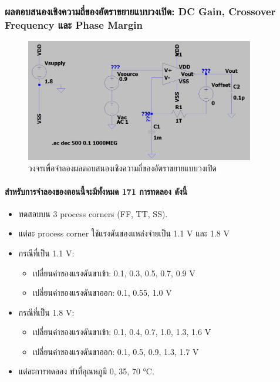 \documentclass[a4paper, 11pt, oneside]{book} %
\begin{document}
\subsubsection{ผลตอบสนองเชิงความถี่ของอัตราขยายแบบวงเปิด: DC Gain, Crossover Frequency และ Phase Margin}

\begin{figure}
    \centering
    \includegraphics[width = 10cm]{measure-openloopgain}
    \caption{วงจรเพื่อจำลองผลตอบสนองเชิงความถี่ของอัตราขยายแบบวงเปิด}
    \label{measure-openloopgain}
\end{figure}

\paragraph{สำหรับการจำลองของตอนนี้จะมีทั้งหมด 171 การทดลอง ดังนี้}

\begin{itemize}
    \item ทดสอบบน 3 process corners (FF, TT, SS).
    \item แต่ละ process corner ใช้แรงดันของแหล่งจ่ายเป็น 1.1 V และ 1.8 V
    \item กรณีที่เป็น 1.1 V:
    \begin{itemize}
        \item เปลี่ยนค่าของแรงดันขาเข้า: 0.1, 0.3, 0.5, 0.7, 0.9 V
        \item เปลี่ยนค่าของแรงดันขาออก: 0.1, 0.55, 1.0 V
    \end{itemize}
    \item กรณีที่เป็น 1.8 V:
    \begin{itemize}
        \item เปลี่ยนค่าของแรงดันขาเข้า: 0.1, 0.4, 0.7, 1.0, 1.3, 1.6 V
        \item เปลี่ยนค่าของแรงดันขาออก: 0.1, 0.5, 0.9, 1.3, 1.7 V
    \end{itemize}
    \item แต่ละการทดลอง ทำที่อุณหภูมิ 0, 35, 70 \si{\degreeCelsius}.
\end{itemize}
\end{document}

